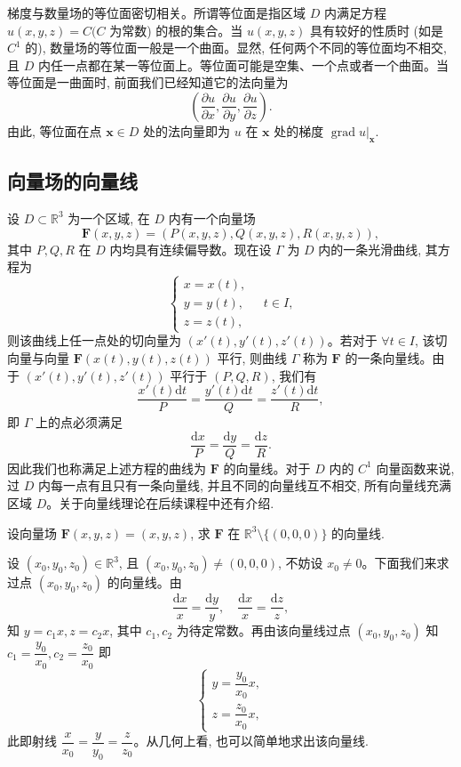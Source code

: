 梯度与数量场的等位面密切相关。所谓等位面是指区域 $D$ 内满足方程 $u(x,y,z)=C(C$ 为常数) 的根的集合。当 $u(x,y,z)$ 具有较好的性质时 (如是 $C^1$ 的), 数量场的等位面一般是一个曲面。显然, 任何两个不同的等位面均不相交, 且 $D$ 内任一点都在某一等位面上。等位面可能是空集、一个点或者一个曲面。当等位面是一曲面时, 前面我们已经知道它的法向量为
\[
  \left(\frac{\partial u}{\partial x},\frac{\partial u}{\partial y},\frac{\partial u}{\partial z}\right).
\]
由此, 等位面在点 $\boldsymbol x\in D$ 处的法向量即为 $u$ 在 $\boldsymbol x$ 处的梯度 $\left.\operatorname{grad}u\right|_{\boldsymbol x}$.

\subsection{向量场的向量线}
\label{subsec:ma-16-8-2}

设 $D\subset\mathbb R^3$ 为一个区域, 在 $D$ 内有一个向量场
\[
  \boldsymbol F(x,y,z)=(P(x,y,z),Q(x,y,z),R(x,y,z)),
\]
其中 $P,Q,R$ 在 $D$ 内均具有连续偏导数。现在设 $\Gamma$ 为 $D$ 内的一条光滑曲线, 其方程为
\[
  \begin{cases}
    x=x(t),\\
    y=y(t),\\
    z=z(t),
  \end{cases}\quad t\in I,
\]
则该曲线上任一点处的切向量为 $(x'(t),y'(t),z'(t))$。若对于 $\forall t\in I$, 该切向量与向量 $\boldsymbol F(x(t),y(t),z(t))$ 平行, 则曲线 $\Gamma$ 称为 $\boldsymbol F$ 的一条向量线。由于 $(x'(t),y'(t),z'(t))$ 平行于 $(P,Q,R)$, 我们有
\[
  \frac{x'(t)\mathrm dt}{P}=\frac{y'(t)\mathrm dt}{Q}=\frac{z'(t)\mathrm dt}{R},
\]
即 $\Gamma$ 上的点必须满足
\[
  \frac{\mathrm dx}{P}=\frac{\mathrm dy}{Q}=\frac{\mathrm dz}{R}.
\]
因此我们也称满足上述方程的曲线为 $\boldsymbol F$ 的向量线。对于 $D$ 内的 $C^1$ 向量函数来说, 过 $D$ 内每一点有且只有一条向量线, 并且不同的向量线互不相交, 所有向量线充满区域 $D$。关于向量线理论在后续课程中还有介绍.

\begin{example}\label{example:ma-16-8-1}
设向量场 $\boldsymbol F(x,y,z)=(x,y,z)$, 求 $\boldsymbol F$ 在 $\mathbb R^3\setminus\{(0,0,0)\}$ 的向量线.
\end{example}


\begin{solve}
设 $(x_0,y_0,z_0)\in\mathbb R^3$, 且 $(x_0,y_0,z_0)\ne(0,0,0)$, 不妨设 $x_0\ne0$。下面我们来求过点 $(x_0,y_0,z_0)$ 的向量线。由
\[
  \frac{\mathrm dx}{x}=\frac{\mathrm dy}{y},\quad
  \frac{\mathrm dx}{x}=\frac{\mathrm dz}{z},
\]
知 $y=c_1x,z=c_2x$, 其中 $c_1,c_2$ 为待定常数。再由该向量线过点 $(x_0,y_0,z_0)$ 知 $c_1=\dfrac{y_0}{x_0},c_2=\dfrac{z_0}{x_0}$ 即
\[
  \begin{cases}
    y=\dfrac{y_0}{x_0}x,\\
    z=\dfrac{z_0}{x_0}x,
  \end{cases}
\]
此即射线 $\dfrac{x}{x_0}=\dfrac{y}{y_0}=\dfrac{z}{z_0}$。从几何上看, 也可以简单地求出该向量线.
\end{solve}


